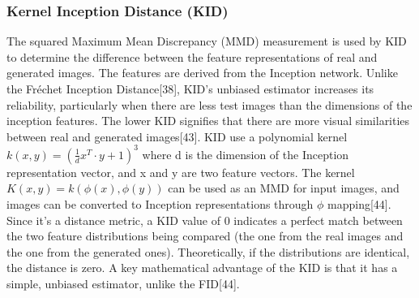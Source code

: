 \documentclass[journal]{IEEEtran}
\begin{document}
\subsubsection{Kernel Inception Distance (KID)}
The squared Maximum Mean Discrepancy (MMD) measurement is used by KID to determine the difference between the feature representations of real and generated images. The features are derived from the Inception network. Unlike the Fréchet Inception Distance[38], KID's unbiased estimator increases its reliability, particularly when there are less test images than the dimensions of the inception features. The lower KID signifies that there are more visual similarities between real and generated images[43].
KID use a polynomial kernel $k(x,y)=(\frac{1}{d}x^T\cdot y+1)^3$ where d is the dimension of the Inception representation vector, and x and y are two feature vectors. The kernel $K(x,y)=k(\phi(x),\phi(y))$ can be used as an MMD for input images, and images can be converted to Inception representations through $\phi$ mapping[44].
Since it's a distance metric, a KID value of 0 indicates a perfect match between the two feature distributions being compared (the one from the real images and the one from the generated ones). Theoretically, if the distributions are identical, the distance is zero. A key mathematical advantage of the KID is that it has a simple, unbiased estimator, unlike the FID[44].
\end{document}
